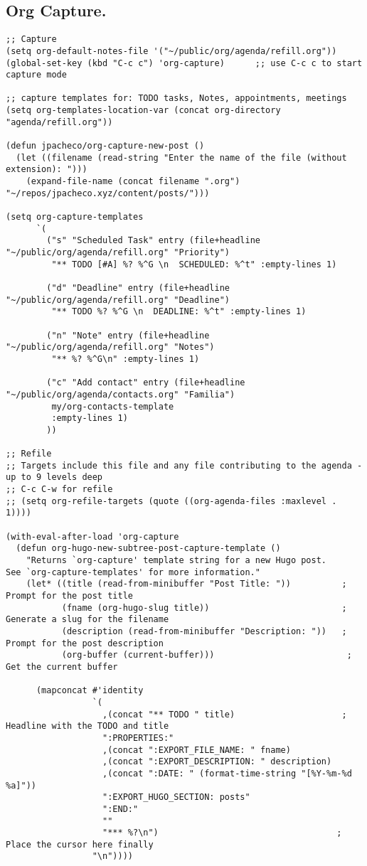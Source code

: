 \documentclass[11pt]{article}
\begin{document}
\subsection{Org Capture.}
\label{sec:orge4244e9}
\begin{verbatim}
;; Capture
(setq org-default-notes-file '("~/public/org/agenda/refill.org"))
(global-set-key (kbd "C-c c") 'org-capture)      ;; use C-c c to start capture mode

;; capture templates for: TODO tasks, Notes, appointments, meetings
(setq org-templates-location-var (concat org-directory "agenda/refill.org"))

(defun jpacheco/org-capture-new-post ()
  (let ((filename (read-string "Enter the name of the file (without extension): ")))
    (expand-file-name (concat filename ".org") "~/repos/jpacheco.xyz/content/posts/")))

(setq org-capture-templates
      `(
        ("s" "Scheduled Task" entry (file+headline "~/public/org/agenda/refill.org" "Priority")
         "** TODO [#A] %? %^G \n  SCHEDULED: %^t" :empty-lines 1)

        ("d" "Deadline" entry (file+headline "~/public/org/agenda/refill.org" "Deadline")
         "** TODO %? %^G \n  DEADLINE: %^t" :empty-lines 1)

        ("n" "Note" entry (file+headline "~/public/org/agenda/refill.org" "Notes")
         "** %? %^G\n" :empty-lines 1)

        ("c" "Add contact" entry (file+headline "~/public/org/agenda/contacts.org" "Familia")
         my/org-contacts-template
         :empty-lines 1)
        ))

;; Refile
;; Targets include this file and any file contributing to the agenda - up to 9 levels deep
;; C-c C-w for refile
;; (setq org-refile-targets (quote ((org-agenda-files :maxlevel . 1))))

(with-eval-after-load 'org-capture
  (defun org-hugo-new-subtree-post-capture-template ()
    "Returns `org-capture' template string for a new Hugo post.
See `org-capture-templates' for more information."
    (let* ((title (read-from-minibuffer "Post Title: "))          ; Prompt for the post title
           (fname (org-hugo-slug title))                          ; Generate a slug for the filename
           (description (read-from-minibuffer "Description: "))   ; Prompt for the post description
           (org-buffer (current-buffer)))                          ; Get the current buffer

      (mapconcat #'identity
                 `(
                   ,(concat "** TODO " title)                     ; Headline with the TODO and title
                   ":PROPERTIES:"
                   ,(concat ":EXPORT_FILE_NAME: " fname)
                   ,(concat ":EXPORT_DESCRIPTION: " description)
                   ,(concat ":DATE: " (format-time-string "[%Y-%m-%d %a]"))
                   ":EXPORT_HUGO_SECTION: posts"
                   ":END:"
                   ""
                   "*** %?\n")                                   ; Place the cursor here finally
                 "\n"))))

\end{verbatim}
\end{document}
